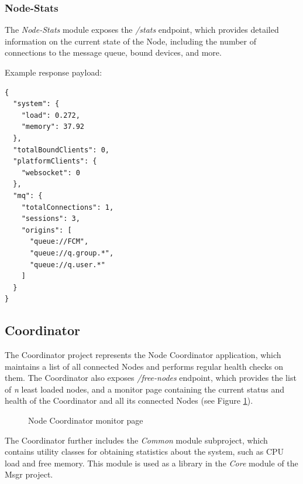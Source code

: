 \subsubsection{Node-Stats}
The \textit{Node-Stats} module exposes the \textit{/stats} endpoint, which provides detailed information on the current state of the Node, including the number of connections to the message queue, bound devices, and more.

Example response payload:
\begin{lstlisting}
{
  "system": {
    "load": 0.272,
    "memory": 37.92
  },
  "totalBoundClients": 0,
  "platformClients": {
    "websocket": 0
  },
  "mq": {
    "totalConnections": 1,
    "sessions": 3,
    "origins": [
      "queue://FCM",
      "queue://q.group.*",
      "queue://q.user.*"
    ]
  }
}
\end{lstlisting}

\subsection{Coordinator}
The Coordinator project represents the Node Coordinator application, which maintains a list of all connected Nodes and performs regular health checks on them. The Coordinator also exposes \textit{/free-nodes} endpoint, which provides the list of \textit{n} least loaded nodes, and a monitor page containing the current status and health of the Coordinator and all its connected Nodes (see Figure \ref{fig:monitor-page}).

\begin{figure}[!ht]
	\centering
    \caption{Node Coordinator monitor page}
    \label{fig:monitor-page}
\end{figure}

The Coordinator further includes the \textit{Common} module subproject, which contains utility classes for obtaining statistics about the system, such as CPU load and free memory. This module is used as a library in the \textit{Core} module of the Msgr project.

